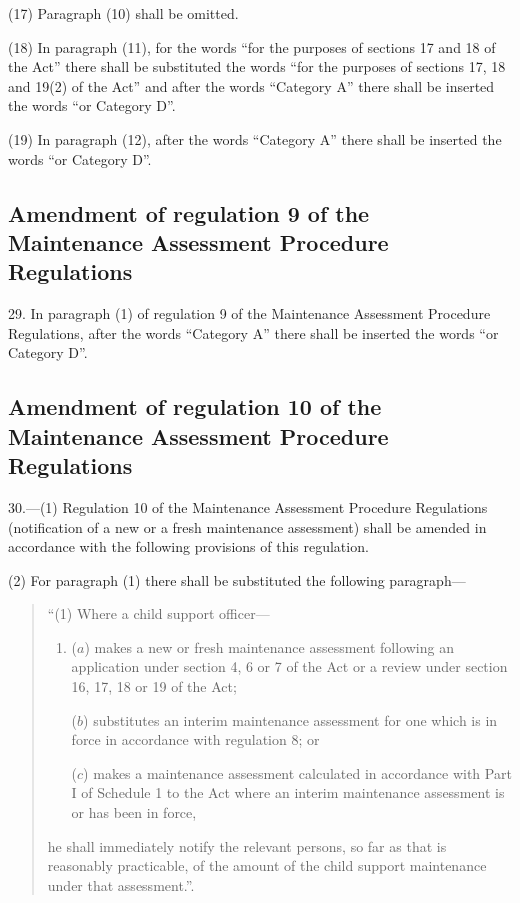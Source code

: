 \documentclass[12pt,a4paper]{article}
\begin{document}
(17) Paragraph (10) shall be omitted.

(18) In paragraph (11), for the words “for the purposes of sections 17 and 18 of the Act” there shall be substituted the words “for the purposes of sections 17, 18 and 19(2) of the Act” and after the words “Category A” there shall be inserted the words “or Category D”.

(19) In paragraph (12), after the words “Category A” there shall be inserted the words “or Category D”.

\subsection[29. Amendment of regulation 9 of the Maintenance Assessment Procedure Regulations]{\sloppy Amendment of regulation 9 of the Maintenance Assessment Procedure Regulations}

29.  In paragraph (1) of regulation 9 of the Maintenance Assessment Procedure Regulations, after the words “Category A” there shall be inserted the words “or Category D”.

\subsection[30. Amendment of regulation 10 of the Maintenance Assessment Procedure Regulations]{Amendment of regulation 10 of the Maintenance Assessment Procedure Regulations}

30.—(1) Regulation 10 of the Maintenance Assessment Procedure Regulations (notification of a new or a fresh maintenance assessment) shall be amended in accordance with the following provisions of this regulation.

(2) For paragraph (1) there shall be substituted the following paragraph—
\begin{quotation}
“(1) Where a child support officer—
\begin{enumerate}\item[]
($a$) makes a new or fresh maintenance assessment following an application under section 4, 6 or 7 of the Act or a review under section 16, 17, 18 or 19 of the Act;

($b$) substitutes an interim maintenance assessment for one which is in force in accordance with regulation 8; or

($c$) makes a maintenance assessment calculated in accordance with Part I of Schedule 1 to the Act where an interim maintenance assessment is or has been in force,
\end{enumerate}
he shall immediately notify the relevant persons, so far as that is reasonably practicable, of the amount of the child support maintenance under that assessment.”.
\end{quotation}
\end{document}
